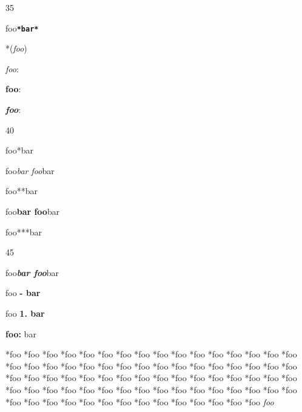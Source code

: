 35

foo\textbf{\texttt{*bar*}}

*(\emph{foo})

\emph{foo}:

\textbf{foo}:

\textbf{\emph{foo}}:

40

foo*bar

foo\emph{bar foo}bar

foo**bar

foo\textbf{bar foo}bar

foo***bar

45

foo\textbf{\emph{bar foo}}bar

foo \textbf{- bar}

foo \textbf{1. bar}

\textbf{foo:} bar

*foo
*foo
*foo
*foo
*foo
*foo
*foo
*foo
*foo
*foo
*foo
*foo
*foo
*foo
*foo
*foo
*foo
*foo
*foo
*foo
*foo
*foo
*foo
*foo
*foo
*foo
*foo
*foo
*foo
*foo
*foo
*foo
*foo
*foo
*foo
*foo
*foo
*foo
*foo
*foo
*foo
*foo
*foo
*foo
*foo
*foo
*foo
*foo
*foo
*foo
*foo
*foo
*foo
*foo
*foo
*foo
*foo
*foo
*foo
*foo
*foo
*foo
*foo
*foo
*foo
*foo
*foo
*foo
*foo
*foo
*foo
*foo
*foo
*foo
*foo
*foo
*foo
*foo
\emph{foo}



